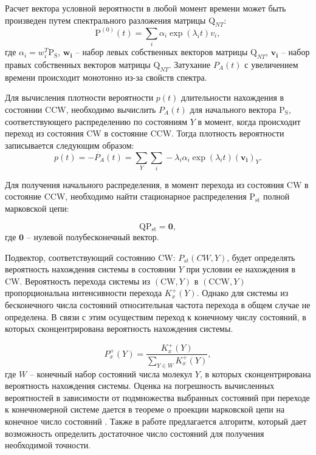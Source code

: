 Расчет вектора условной вероятности в любой момент времени может быть произведен путем спектрального разложения матрицы $\boldsymbol{\mathrm{Q}}_{NT}$:
\begin{equation}
    \boldsymbol{\mathrm{P}}^{(0)}(t) = \sum_i \alpha_i \exp(\lambda_i t) v_i,
    \label{eq:solution-no-transition-prob}
\end{equation}
где $\alpha_i=w_i^T \boldsymbol{\mathrm{P_S}}$, $\boldsymbol{w_i}$ -- набор левых собственных векторов матрицы $\boldsymbol{\mathrm{Q}}_{NT}$, $\boldsymbol{v_i}$ -- набор правых собственных векторов матрицы $\boldsymbol{\mathrm{Q}}_{NT}$. Затухание $P_A(t)$ с увеличением времени происходит монотонно из-за свойств спектра.

Для вычисления плотности вероятности $p(t)$ длительности нахождения в состоянии CCW, необходимо вычислить $P_A(t)$ для начального вектора $\boldsymbol{\mathrm{P_S}}$, соответствующего распределению по состояниям $Y$ в момент, когда происходит переход из состояния CW в состояние CCW.
Тогда плотность вероятности записывается следующим образом:
\begin{equation}
    p(t) = -\dot{P_A}(t) = \sum_Y \sum_i -\lambda_i \alpha_i \exp(\lambda_i t) (\boldsymbol{v_i})_Y.
    \label{eq:solution-no-transition-pdf}
\end{equation}

Для получения начального распределения, в момент перехода из состояния CW в состояние CCW, необходимо найти стационарное распределения $\boldsymbol{\mathrm{P_{st}}}$ полной марковской цепи:

\begin{equation}
    \boldsymbol{\mathrm{Q}} \boldsymbol{\mathrm{P_{st}}} = \boldsymbol{0},
    \label{eq:transitions-stationary}
\end{equation}
где $\boldsymbol{0}$ -- нулевой полубесконечный вектор.

Подвектор, соответствующий состоянию CW: ${P_{st}(CW, Y)}$, будет определять вероятность нахождения системы в состоянии $Y$ при условии ее нахождения в CW. Вероятность перехода системы из $(\mathrm{CW}, Y)$ в $(\mathrm{CCW}, Y)$ пропорциональна интенсивности перехода $K_x^+(Y)$. Однако для системы из бесконечного числа состояний относительная частота перехода в общем случае не определена. В связи с этим осуществим переход к конечному числу состояний, в которых сконцентрирована вероятность нахождения системы. 

\begin{equation}
    P_x^+(Y)=\frac{K_x^+(Y)}{\sum_{Y\in W} K_x^+(Y)},
    \label{eq:cw-to-ccw-prob}
\end{equation}
где $W$ -- конечный набор состояний числа молекул $Y$, в которых сконцентрирована вероятность нахождения системы. Оценка на погрешность вычисленных вероятностей в зависимости от подмножества выбранных состояний при переходе к конечномерной системе дается в теореме о проекции марковской цепи на конечное число состояний \cite{munsky_finite_2006}. Также в работе предлагается алгоритм, который дает возможность определить достаточное число состояний для получения необходимой точности.

